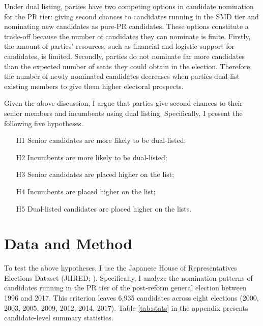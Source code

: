 \documentclass[a4paper, 11pt]{article}
\begin{document}
Under dual listing, parties have two competing options in candidate nomination for the PR tier: giving second chances to candidates running in the SMD tier and nominating new candidates as pure-PR candidates. These options constitute a trade-off because the number of candidates they can nominate is finite. Firstly, the amount of parties' resources, such as financial and logistic support for candidates, is limited. Secondly, parties do not nominate far more candidates than the expected number of seats they could obtain in the election. Therefore, the number of newly nominated candidates decreases when parties dual-list existing members to give them higher electoral prospects. 

Given the above discussion, I argue that parties give second chances to their senior members and incumbents using dual listing. Specifically, I present the following five hypotheses. 

\begin{enumerate}
	\item[H1] Senior candidates are more likely to be dual-listed; 
	\item[H2] Incumbents are more likely to be dual-listed; 
	\item[H3] Senior candidates are placed higher on the list; 
	\item[H4] Incumbents are placed higher on the list; 
	\item[H5] Dual-listed candidates are placed higher on the lists. 
\end{enumerate}


\section{Data and Method} \label{sec: emp}

To test the above hypotheses, I use the Japanese House of Representatives Elections Dataset (JHRED; \citet{reedsmith2018}). Specifically, I analyze the nomination patterns of candidates running in the PR tier of the post-reform general election between 1996 and 2017. This criterion leaves 6,935 candidates across eight elections (2000, 2003, 2005, 2009, 2012, 2014, 2017). Table \ref{tab:stats} in the appendix presents candidate-level summary statistics.
\end{document}
